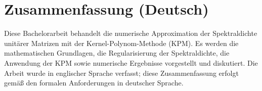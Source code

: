 \section{Zusammenfassung (Deutsch)}
Diese Bachelorarbeit behandelt die numerische Approximation der Spektraldichte unitärer Matrizen mit der Kernel-Polynom-Methode (KPM). Es werden die mathematischen Grundlagen, die Regularisierung der Spektraldichte, die Anwendung der KPM sowie numerische Ergebnisse vorgestellt und diskutiert. Die Arbeit wurde in englischer Sprache verfasst; diese Zusammenfassung erfolgt gemäß den formalen Anforderungen in deutscher Sprache.